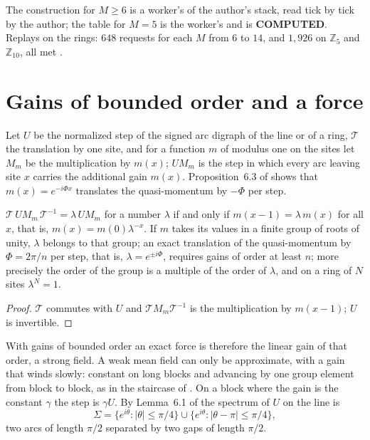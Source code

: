 The construction for $M\ge6$ is a worker's of the author's stack, read tick by tick by the author; the table for $M=5$ is the worker's and is \textbf{COMPUTED}. Replays on the rings: $648$ requests for each $M$ from $6$ to $14$, and $1{,}926$ on $\mathbb{Z}_5$ and $\mathbb{Z}_{10}$, all met \cite{comptp}.

\section{Gains of bounded order and a force}\label{sec:force}

Let $U$ be the normalized step of the signed arc digraph of the line or of a ring, $\mathcal{T}$ the translation by one site, and for a function $m$ of modulus one on the sites let $M_m$ be the multiplication by $m(x)$; $UM_m$ is the step in which every arc leaving site $x$ carries the additional gain $m(x)$. Proposition~6.3 of \cite{g9} shows that $m(x)=e^{-i\Phi x}$ translates the quasi-momentum by $-\Phi$ per step.

\begin{proposition}\label{prop:exact}
$\mathcal{T}\,UM_m\,\mathcal{T}^{-1}=\lambda\,UM_m$ for a number $\lambda$ if and only if $m(x-1)=\lambda\,m(x)$ for all $x$, that is, $m(x)=m(0)\lambda^{-x}$. If $m$ takes its values in a finite group of roots of unity, $\lambda$ belongs to that group; an exact translation of the quasi-momentum by $\Phi=2\pi/n$ per step, that is, $\lambda=e^{\pm i\Phi}$, requires gains of order at least $n$; more precisely the order of the group is a multiple of the order of $\lambda$, and on a ring of $N$ sites $\lambda^N=1$.
\end{proposition}
\begin{proof}
$\mathcal{T}$ commutes with $U$ and $\mathcal{T}M_m\mathcal{T}^{-1}$ is the multiplication by $m(x-1)$; $U$ is invertible.
\end{proof}

With gains of bounded order an exact force is therefore the linear gain of that order, a strong field. A weak mean field can only be approximate, with a gain that winds slowly: constant on long blocks and advancing by one group element from block to block, as in the staircase of \cite{g9}. On a block where the gain is the constant $\gamma$ the step is $\gamma U$. By Lemma~6.1 of \cite{g9} the spectrum of $U$ on the line is
\[
\Sigma=\{e^{i\theta}:|\theta|\le\pi/4\}\cup\{e^{i\theta}:|\theta-\pi|\le\pi/4\},
\]
two arcs of length $\pi/2$ separated by two gaps of length $\pi/2$.

